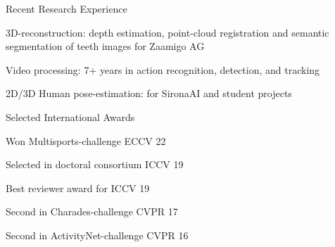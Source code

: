 \documentclass{resume_short} %
\begin{document}
\begin{paracol}{2}
\begin{rSection}{Recent Research Experience}{} 
\begin{sSubsection}{3D-reconstruction: depth estimation, point-cloud registration and semantic segmentation of teeth images for Zaamigo AG}\end{sSubsection}
\begin{sSubsection}{Video processing: 7+ years in action recognition, detection, and tracking}\end{sSubsection}
\begin{sSubsection}{ 2D/3D Human pose-estimation: for SironaAI and student projects}\end{sSubsection}

\end{rSection}
\switchcolumn
\vspace{0.75mm}
\begin{rSection}{Selected International Awards }{}
\begin{sSubsection}{Won Multisports-challenge ECCV 22}\end{sSubsection} %
\begin{sSubsection}{Selected in doctoral consortium ICCV 19}\end{sSubsection}  %
\begin{sSubsection}{Best reviewer award for ICCV 19}\end{sSubsection} %
\begin{sSubsection}{Second in Charades-challenge CVPR 17}\end{sSubsection} %
\begin{sSubsection}{Second in ActivityNet-challenge CVPR 16}\end{sSubsection} %
\end{rSection}


\end{paracol}
\end{document}
